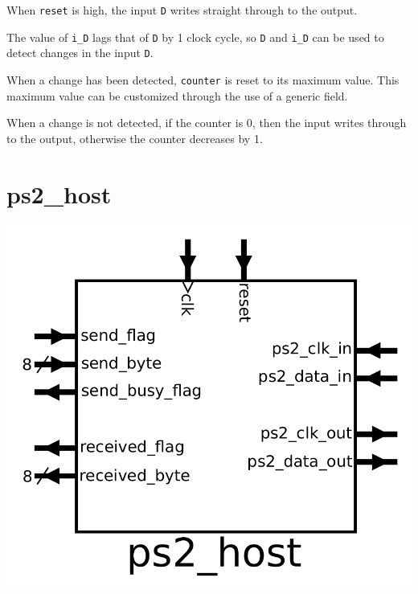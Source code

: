 \documentclass{article}
\begin{document}
\vspace{5mm}

When \texttt{reset} is high, the input \texttt{D} writes straight through to the output. 

The value of \texttt{i\_D} lags that of \texttt{D} by 1 clock cycle, so \texttt{D} and \texttt{i\_D} can be used to detect changes in the input \texttt{D}. 

When a change has been detected, \texttt{counter} is reset to its maximum value. This maximum value can be customized through the use of a generic field.   

When a change is not detected, if the counter is \(0\), then the input writes through to the output, otherwise the counter decreases by 1.  



\section*{ps2\_host}

\begin{center}
\includegraphics[width = \textwidth]{ps2_host}
\end{center}
\end{document}
